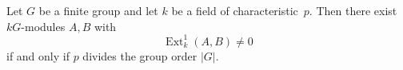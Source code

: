 \begin{theorem}[Maschke]
\label{thm:maschke-homological}
Let $G$ be a finite group and let $k$ be a field of characteristic~$p$. Then there exist $kG$-modules $A, B$ with
$$
\operatorname{Ext}_k^1(A, B) \neq 0
$$
if and only if $p$ divides the group order $|G|$.
\end{theorem}
